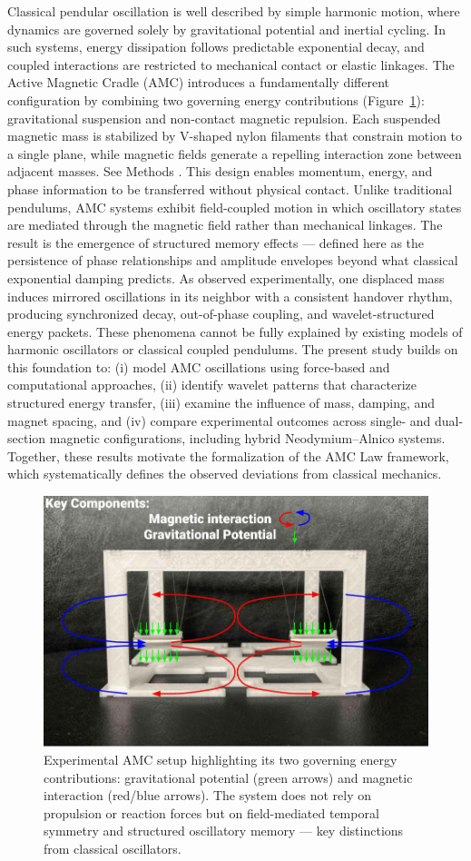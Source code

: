 \documentclass[10pt,aps,pre,onecolumn,superscriptaddress,notitlepage]{revtex4-2}
\begin{document}
Classical pendular oscillation is well described by simple harmonic motion, where dynamics are governed solely by gravitational potential and inertial cycling. In such systems, energy dissipation follows predictable exponential decay, and coupled interactions are restricted to mechanical contact or elastic linkages.
The Active Magnetic Cradle (AMC) introduces a fundamentally different configuration by combining two governing energy contributions (Figure~\ref{fig:intro}): gravitational suspension and non-contact magnetic repulsion. Each suspended magnetic mass is stabilized by V-shaped nylon filaments that constrain motion to a single plane, while magnetic fields generate a repelling interaction zone between adjacent masses. See Methods \cite{karim2025methods}. This design enables momentum, energy, and phase information to be transferred without physical contact.
Unlike traditional pendulums, AMC systems exhibit field-coupled motion in which oscillatory states are mediated through the magnetic field rather than mechanical linkages. The result is the emergence of structured memory effects — defined here as the persistence of phase relationships and amplitude envelopes beyond what classical exponential damping predicts. As observed experimentally, one displaced mass induces mirrored oscillations in its neighbor with a consistent handover rhythm, producing synchronized decay, out-of-phase coupling, and wavelet-structured energy packets. These phenomena cannot be fully explained by existing models of harmonic oscillators or classical coupled pendulums.
The present study builds on this foundation to: (i) model AMC oscillations using force-based and computational approaches, (ii) identify wavelet patterns that characterize structured energy transfer, (iii) examine the influence of mass, damping, and magnet spacing, and (iv) compare experimental outcomes across single- and dual-section magnetic configurations, including hybrid Neodymium–Alnico systems. Together, these results motivate the formalization of the AMC Law framework, which systematically defines the observed deviations from classical mechanics.
\begin{figure}[htbp]
    \centering
    \includegraphics[width=0.5\linewidth]{figures/fig_intro_geometry_AMC_Magnetic_repulsion_forces.jpg}
    \caption{Experimental AMC setup highlighting its two governing energy contributions: gravitational potential (green arrows) and magnetic interaction (red/blue arrows). The system does not rely on propulsion or reaction forces but on field-mediated temporal symmetry and structured oscillatory memory — key distinctions from classical oscillators.}
    \label{fig:intro}
\end{figure}
\end{document}
